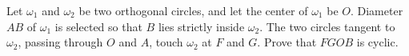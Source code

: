 Let $\omega_1$ and $\omega_2$ be two orthogonal circles, and let the center of $\omega_1$ be $O$. Diameter $AB$ of $\omega_1$ is selected so that $B$ lies strictly inside $\omega_2$.  The two circles tangent to $\omega_2$, passing through $O$ and $A$, touch $\omega_2$ at $F$ and $G$. Prove that $FGOB$ is cyclic.

